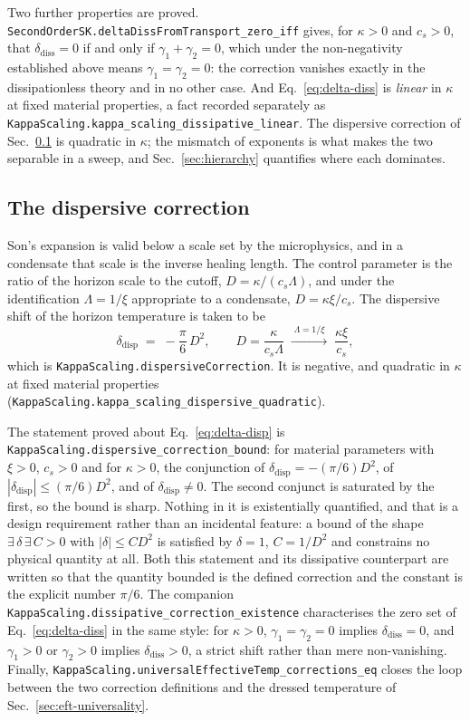 \documentclass[aps,prd,reprint,nofootinbib,superscriptaddress]{revtex4-2}
\begin{document}
Two further properties are proved.
\texttt{SecondOrderSK.deltaDissFromTransport\_zero\_iff} gives, for
$\kappa > 0$ and $c_s > 0$, that $\delta_{\mathrm{diss}} = 0$ if and only
if $\gamma_1+\gamma_2 = 0$, which under the non-negativity established
above means $\gamma_1 = \gamma_2 = 0$: the correction vanishes exactly in
the dissipationless theory and in no other case. And
Eq.~\eqref{eq:delta-diss} is \emph{linear} in $\kappa$ at fixed material
properties, a fact recorded separately as
\texttt{KappaScaling.kappa\_scaling\_dissipative\_linear}. The dispersive
correction of Sec.~\ref{sec:eft-disp} is quadratic in $\kappa$; the
mismatch of exponents is what makes the two separable in a sweep, and
Sec.~\ref{sec:hierarchy} quantifies where each dominates.

\subsection{The dispersive correction}
\label{sec:eft-disp}

Son's expansion is valid below a scale set by the microphysics, and in a
condensate that scale is the inverse healing length. The control
parameter is the ratio of the horizon scale to the cutoff,
$D = \kappa/(c_s\Lambda)$, and under the identification
$\Lambda = 1/\xi$ appropriate to a condensate, $D = \kappa\xi/c_s$. The
dispersive shift of the horizon temperature is taken to be
\begin{equation}
\label{eq:delta-disp}
\delta_{\mathrm{disp}} \;=\; -\frac{\pi}{6}\,D^{2},
\qquad D = \frac{\kappa}{c_s\Lambda}
\;\xrightarrow{\;\Lambda = 1/\xi\;}\; \frac{\kappa\xi}{c_s},
\end{equation}
which is \texttt{KappaScaling.dispersiveCorrection}. It is negative, and
quadratic in $\kappa$ at fixed material properties
(\texttt{KappaScaling.kappa\_scaling\_dispersive\_quadratic}).

The statement proved about Eq.~\eqref{eq:delta-disp} is
\texttt{KappaScaling.dispersive\_correction\_bound}: for material
parameters with $\xi > 0$, $c_s > 0$ and for $\kappa > 0$, the
conjunction of $\delta_{\mathrm{disp}} = -(\pi/6)D^{2}$, of
$|\delta_{\mathrm{disp}}| \leq (\pi/6)D^{2}$, and of
$\delta_{\mathrm{disp}} \neq 0$. The second conjunct is saturated by the
first, so the bound is sharp. Nothing in it is existentially quantified,
and that is a design requirement rather than an incidental feature: a
bound of the shape $\exists\,\delta\,\exists\,C > 0$ with
$|\delta| \leq C D^{2}$ is satisfied by $\delta = 1$, $C = 1/D^{2}$ and
constrains no physical quantity at all. Both this statement and its
dissipative counterpart are written so that the quantity bounded is the
defined correction and the constant is the explicit number $\pi/6$. The
companion \texttt{KappaScaling.dissipative\_correction\_existence}
characterises the zero set of Eq.~\eqref{eq:delta-diss} in the same
style: for $\kappa > 0$, $\gamma_1 = \gamma_2 = 0$ implies
$\delta_{\mathrm{diss}} = 0$, and $\gamma_1 > 0$ or $\gamma_2 > 0$
implies $\delta_{\mathrm{diss}} > 0$, a strict shift rather than mere
non-vanishing. Finally,
\texttt{KappaScaling.universalEffectiveTemp\_corrections\_eq} closes the
loop between the two correction definitions and the dressed temperature
of Sec.~\ref{sec:eft-universality}.
\end{document}
